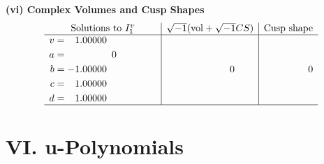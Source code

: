 \documentclass[1p]{elsarticle_modified}
\theoremstyle{definition}
\newcommand{\I}{\sqrt{-1}}
\begin{document}
\newpage\flushleft \textbf{(vi) Complex Volumes and Cusp Shapes}
$$\begin{array}{c|c|c}  
\text{Solutions to }I^v_{1}& \I (\text{vol} + \sqrt{-1}CS) & \text{Cusp shape}\\
 \hline 
\begin{aligned}
v &= \phantom{-}1.00000\phantom{ +0.000000I} \\
a &= \phantom{-0.000000 } 0 \\
b &= -1.00000\phantom{ +0.000000I} \\
c &= \phantom{-}1.00000\phantom{ +0.000000I} \\
d &= \phantom{-}1.00000\phantom{ +0.000000I}\end{aligned}
 & \phantom{-0.000000 } 0 & \phantom{-0.000000 } 0\\
 \hline 
 \end{array}$$\newpage
\newpage\renewcommand{\arraystretch}{1}
\centering \section*{ VI. u-Polynomials}
\end{document}
